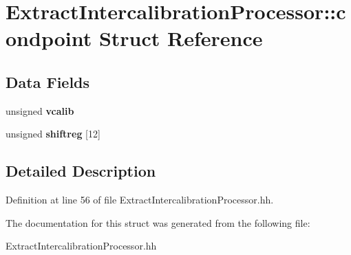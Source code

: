 \section{Extract\-Intercalibration\-Processor\-:\-:condpoint Struct Reference}
\label{structExtractIntercalibrationProcessor_1_1condpoint}
\subsection*{Data Fields}
\begin{DoxyCompactItemize}
\item 
unsigned {\bfseries vcalib}\label{structExtractIntercalibrationProcessor_1_1condpoint_ac5c276f523c1eef9621784169140e1b9}

\item 
unsigned {\bfseries shiftreg} [12]\label{structExtractIntercalibrationProcessor_1_1condpoint_ab82b62e1c2e2e4231763968305476e8c}

\end{DoxyCompactItemize}


\subsection{Detailed Description}


Definition at line 56 of file Extract\-Intercalibration\-Processor.\-hh.



The documentation for this struct was generated from the following file\-:\begin{DoxyCompactItemize}
\item 
Extract\-Intercalibration\-Processor.\-hh\end{DoxyCompactItemize}
